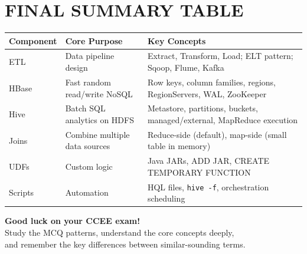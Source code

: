\documentclass[11pt, onecolumn, a4paper]{article}
\begin{document}
\newpage
\section{FINAL SUMMARY TABLE}

\begin{center}
\begin{tabular}{|l|l|p{5cm}|}
\hline
\textbf{Component} & \textbf{Core Purpose} & \textbf{Key Concepts} \\
\hline
ETL & Data pipeline design & Extract, Transform, Load; ELT pattern; Sqoop, Flume, Kafka \\
\hline
HBase & Fast random read/write NoSQL & Row keys, column families, regions, RegionServers, WAL, ZooKeeper \\
\hline
Hive & Batch SQL analytics on HDFS & Metastore, partitions, buckets, managed/external, MapReduce execution \\
\hline
Joins & Combine multiple data sources & Reduce-side (default), map-side (small table in memory) \\
\hline
UDFs & Custom logic & Java JARs, ADD JAR, CREATE TEMPORARY FUNCTION \\
\hline
Scripts & Automation & HQL files, \texttt{hive -f}, orchestration scheduling \\
\hline
\end{tabular}
\end{center}

\vspace{1cm}

\begin{center}
\textbf{Good luck on your CCEE exam!} \\
Study the MCQ patterns, understand the core concepts deeply, \\
and remember the key differences between similar-sounding terms.
\end{center}
\end{document}
